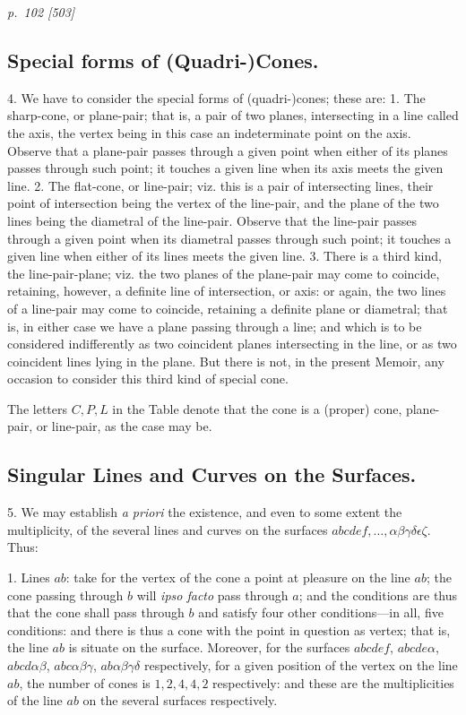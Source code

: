 \documentclass[11pt,a4paper]{article}
\newcommand{\sourcepage}[2]{%
  \bigskip
  \noindent\textit{p.~#1 [#2]}%
  \par\smallskip
}
\begin{document}
\sourcepage{102}{503}
\subsection*{Special forms of (Quadri-)Cones.}

4. We have to consider the special forms of (quadri-)cones; these are: 1\textdegree.
The sharp-cone, or plane-pair; that is, a pair of two planes, intersecting in a line
called the axis, the vertex being in this case an indeterminate point on the axis.
Observe that a plane-pair passes through a given point when either of its planes
passes through such point; it touches a given line when its axis meets the given
line. 2\textdegree. The flat-cone, or line-pair; viz. this is a pair of intersecting
lines, their point of intersection being the vertex of the line-pair, and the plane of
the two lines being the diametral of the line-pair. Observe that the line-pair passes
through a given point when its diametral passes through such point; it touches a
given line when either of its lines meets the given line. 3\textdegree. There is a
third kind, the line-pair-plane; viz. the two planes of the plane-pair may come to
coincide, retaining, however, a definite line of intersection, or axis: or again, the two
lines of a line-pair may come to coincide, retaining a definite plane or diametral;
that is, in either case we have a plane passing through a line; and which is to be
considered indifferently as two coincident planes intersecting in the line, or as two
coincident lines lying in the plane. But there is not, in the present Memoir, any
occasion to consider this third kind of special cone.

The letters $C,P,L$ in the Table denote that the cone is a (proper) cone, plane-pair,
or line-pair, as the case may be.

\subsection*{Singular Lines and Curves on the Surfaces.}

5. We may establish \textit{a priori} the existence, and even to some extent the
multiplicity, of the several lines and curves on the surfaces
$abcdef,\ldots,\alpha\beta\gamma\delta\epsilon\zeta$. Thus:

1\textdegree. Lines $ab$: take for the vertex of the cone a point at pleasure on the
line $ab$; the cone passing through $b$ will \textit{ipso facto} pass through $a$; and
the conditions are thus that the cone shall pass through $b$ and satisfy four other
conditions---in all, five conditions: and there is thus a cone with the point in
question as vertex; that is, the line $ab$ is situate on the surface. Moreover, for
the surfaces $abcdef$, $abcde\alpha$, $abcd\alpha\beta$, $abc\alpha\beta\gamma$,
$ab\alpha\beta\gamma\delta$ respectively, for a given position of the vertex on the
line $ab$, the number of cones is $1,2,4,4,2$ respectively: and these are the
multiplicities of the line $ab$ on the several surfaces respectively.
\end{document}
